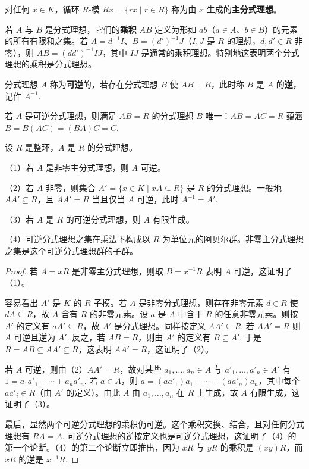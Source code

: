 对任何 \(x \in K\)，循环 \(R\)-模 \(Rx = \{rx \mid r \in R\}\) 称为由 \(x\) 生成的\textbf{主分式理想}。

若 \(A\) 与 \(B\) 是分式理想，它们的\textbf{乘积} \(AB\) 定义为形如 \(ab\)（\(a \in A\)、\(b \in B\)）的元素的所有有限和之集。若 \(A = d^{-1}I\)、\(B = (d')^{-1}J\)（\(I, J\) 是 \(R\) 的理想，\(d, d' \in R\) 非零），则 \(AB = (dd')^{-1}IJ\)，其中 \(IJ\) 是通常的乘积理想。特别地这表明两个分式理想的乘积是分式理想。

\begin{definition}
分式理想 \(A\) 称为\textbf{可逆}的，若存在分式理想 \(B\) 使 \(AB = R\)，此时称 \(B\) 是 \(A\) 的\textbf{逆}，记作 \(A^{-1}\).
\end{definition}

若 \(A\) 是可逆分式理想，则满足 \(AB = R\) 的分式理想 \(B\) 唯一：\(AB = AC = R\) 蕴涵 \(B = B(AC) = (BA)C = C\).

\begin{proposition}\label{pro:16.9}
设 \(R\) 是整环，\(A\) 是 \(R\) 的分式理想。

（1）若 \(A\) 是非零主分式理想，则 \(A\) 可逆。

（2）若 \(A\) 非零，则集合 \(A' = \{x \in K \mid xA \subseteq R\}\) 是 \(R\) 的分式理想。一般地 \(AA' \subseteq R\)，且 \(AA' = R\) 当且仅当 \(A\) 可逆，此时 \(A^{-1} = A'\).

（3）若 \(A\) 是 \(R\) 的可逆分式理想，则 \(A\) 有限生成。

（4）可逆分式理想之集在乘法下构成以 \(R\) 为单位元的阿贝尔群。非零主分式理想之集是这个可逆分式理想群的子群。
\end{proposition}

\begin{proof}
若 \(A = xR\) 是非零主分式理想，则取 \(B = x^{-1}R\) 表明 \(A\) 可逆，这证明了（1）。

容易看出 \(A'\) 是 \(K\) 的 \(R\)-子模。若 \(A\) 是非零分式理想，则存在非零元素 \(d \in R\) 使 \(dA \subseteq R\)，故 \(A\) 含有 \(R\) 的非零元素。设 \(a\) 是 \(A\) 中含于 \(R\) 的任意非零元素。则按 \(A'\) 的定义有 \(aA' \subseteq R\)，故 \(A'\) 是分式理想。同样按定义 \(AA' \subseteq R\). 若 \(AA' = R\) 则 \(A\) 可逆且逆为 \(A'\). 反之，若 \(AB = R\)，则由 \(A'\) 的定义有 \(B \subseteq A'\). 于是 \(R = AB \subseteq AA' \subseteq R\)，这表明 \(AA' = R\)，这证明了（2）。

若 \(A\) 可逆，则由（2）\(AA' = R\)，故对某些 \(a_1, \ldots, a_n \in A\) 与 \(a'_1, \ldots, a'_n \in A'\) 有 \(1 = a_1a'_1+\cdots+a_na'_n\). 若 \(a \in A\)，则 \(a = (aa'_1)a_1+\cdots+(aa'_n)a_n\)，其中每个 \(aa'_i \in R\)（由 \(A'\) 的定义）。由此 \(A\) 由 \(a_1, \ldots, a_n\) 在 \(R\) 上生成，故 \(A\) 有限生成，这证明了（3）。

最后，显然两个可逆分式理想的乘积仍可逆。这个乘积交换、结合，且对任何分式理想有 \(RA = A\). 可逆分式理想的逆按定义也是可逆分式理想，这证明了（4）的第一个论断。（4）的第二个论断立即推出，因为 \(xR\) 与 \(yR\) 的乘积是 \((xy)R\)，而 \(xR\) 的逆是 \(x^{-1}R\).
\end{proof}


